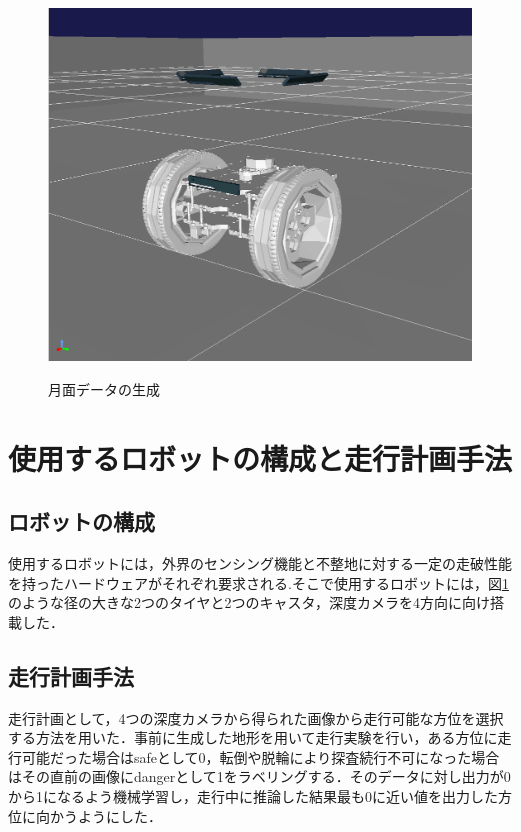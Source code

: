 \documentclass[a4paper,twocolumn,9pt]{jsarticle}
\begin{document}
\begin{figure}[b]
\begin{minipage}[b]{0.4\linewidth}
    \label{fig:moon_gen}
  \end{minipage}
  \begin{minipage}[b]{0.4\linewidth}
    \centering
    \includegraphics[keepaspectratio, scale=0.07]{figures/robot_visual.png}
    \label{fig:robot}
   \end{minipage}
  \caption{月面データの生成}
\end{figure}

\section{使用するロボットの構成と走行計画手法}
\subsection{ロボットの構成}
使用するロボットには，外界のセンシング機能と不整地に対する一定の走破性能を持ったハードウェアがそれぞれ要求される.そこで使用するロボットには，図\ref{fig:robot}のような径の大きな2つのタイヤと2つのキャスタ，深度カメラを4方向に向け搭載した．


 \subsection{走行計画手法}
走行計画として，4つの深度カメラから得られた画像から走行可能な方位を選択する方法を用いた．事前に生成した地形を用いて走行実験を行い，ある方位に走行可能だった場合はsafeとして0，転倒や脱輪により探査続行不可になった場合はその直前の画像にdangerとして1をラベリングする．そのデータに対し出力が0から1になるよう機械学習し，走行中に推論した結果最も0に近い値を出力した方位に向かうようにした．
\end{document}
